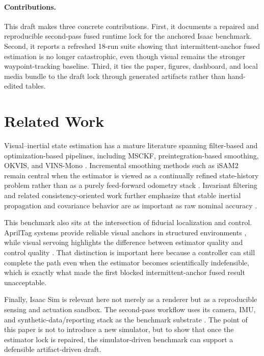 \documentclass[11pt]{article}
\begin{document}
\paragraph{Contributions.}
This draft makes three concrete contributions. First, it documents a repaired and reproducible second-pass fused runtime lock for the anchored Isaac benchmark. Second, it reports a refreshed 18-run suite showing that intermittent-anchor fused estimation is no longer catastrophic, even though visual remains the stronger waypoint-tracking baseline. Third, it ties the paper, figures, dashboard, and local media bundle to the draft lock through generated artifacts rather than hand-edited tables.

\section{Related Work}
Visual--inertial state estimation has a mature literature spanning filter-based and optimization-based pipelines, including MSCKF, preintegration-based smoothing, OKVIS, and VINS-Mono \cite{mourikis2007msckf,forster2017preintegration,leutenegger2015okvis,qin2018vinsmono}. Incremental smoothing methods such as iSAM2 remain central when the estimator is viewed as a continually refined state-history problem rather than as a purely feed-forward odometry stack \cite{kaess2012isam2}. Invariant filtering and related consistency-oriented work further emphasize that stable inertial propagation and covariance behavior are as important as raw nominal accuracy \cite{barrau2017inekf,brossard2018invariantvislam}.

This benchmark also sits at the intersection of fiducial localization and control. AprilTag systems provide reliable visual anchors in structured environments \cite{olson2011apriltag,wang2016apriltag2}, while visual servoing highlights the difference between estimator quality and control quality \cite{chaumette2006part1,chaumette2007part2}. That distinction is important here because a controller can still complete the path even when the estimator becomes scientifically indefensible, which is exactly what made the first blocked intermittent-anchor fused result unacceptable.

Finally, Isaac Sim is relevant here not merely as a renderer but as a reproducible sensing and actuation sandbox. The second-pass workflow uses its camera, IMU, and synthetic-data/reporting stack as the benchmark substrate \cite{nvidia_isaac_imu,nvidia_isaac_replicator,nvidia_isaac_sdr,nvidia_isaac_sim_manager}. The point of this paper is not to introduce a new simulator, but to show that once the estimator lock is repaired, the simulator-driven benchmark can support a defensible artifact-driven draft.
\end{document}
